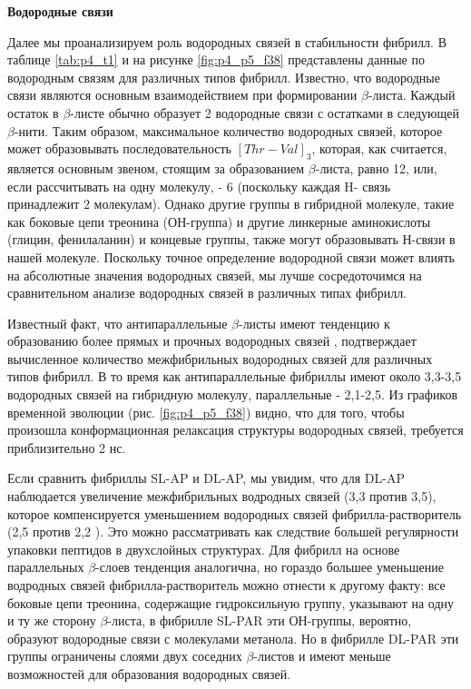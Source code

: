     \textbf{Водородные связи}

    Далее мы проанализируем роль водородных связей в стабильности фибрилл. В таблице \ref{tab:p4_t1} и на рисунке \ref{fig:p4_p5_f38} представлены данные по водородным связям для различных типов фибрилл. Известно, что водородные связи являются основным взаимодействием при формировании $\beta$-листа. Каждый остаток в $\beta$-листе обычно образует 2 водородные связи с остатками в следующей $\beta$-нити. Таким образом, максимальное количество водородных связей, которое может образовывать последовательность $[Thr-Val]_3$, которая, как считается, является основным звеном, стоящим за образованием $\beta$-листа, равно 12, или, если рассчитывать на одну молекулу, - 6 (поскольку каждая H- связь принадлежит 2 молекулам). Однако другие группы в гибридной молекуле, такие как боковые цепи треонина (ОН-группа) и другие линкерные аминокислоты (глицин, фенилаланин) и концевые группы, также могут образовывать Н-связи в нашей молекуле. Поскольку точное определение водородной связи может влиять на абсолютные значения водородных связей, мы лучше сосредоточимся на сравнительном анализе водородных связей в различных типах фибрилл.

    Известный факт, что антипараллельные $\beta$-листы имеют тенденцию к образованию более прямых и прочных водородных связей \cite{lehninger_lehninger_2008}, подтверждает вычисленное количество межфибрильных водородных связей для различных типов фибрилл. В то время как антипараллельные фибриллы имеют около 3,3-3,5 водородных связей на гибридную молекулу, параллельные - 2,1-2,5. Из графиков временной эволюции (рис. \ref{fig:p4_p5_f38}) видно, что для того, чтобы произошла конформационная релаксация структуры водородных связей, требуется приблизительно 2 нс.

    Если сравнить фибриллы SL-AP и DL-AP, мы увидим, что для DL-AP наблюдается увеличение межфибрильных водродных связей (3,3 против 3,5), которое компенсируется уменьшением водородных связей фибрилла-растворитель (2,5 против 2,2 ). Это можно рассматривать как следствие большей регулярности упаковки пептидов в двухслойных структурах. Для фибрилл на основе параллельных $\beta$-слоев тенденция аналогична, но гораздо большее уменьшение водродных связей фибрилла-растворитель можно отнести к другому факту: все боковые цепи треонина, содержащие гидроксильную группу, указывают на одну и ту же сторону $\beta$-листа, в фибрилле SL-PAR эти ОН-группы, вероятно, образуют водородные связи с молекулами метанола. Но в фибрилле DL-PAR эти группы ограничены слоями двух соседних $\beta$-листов и имеют меньше возможностей для образования водородных связей.

